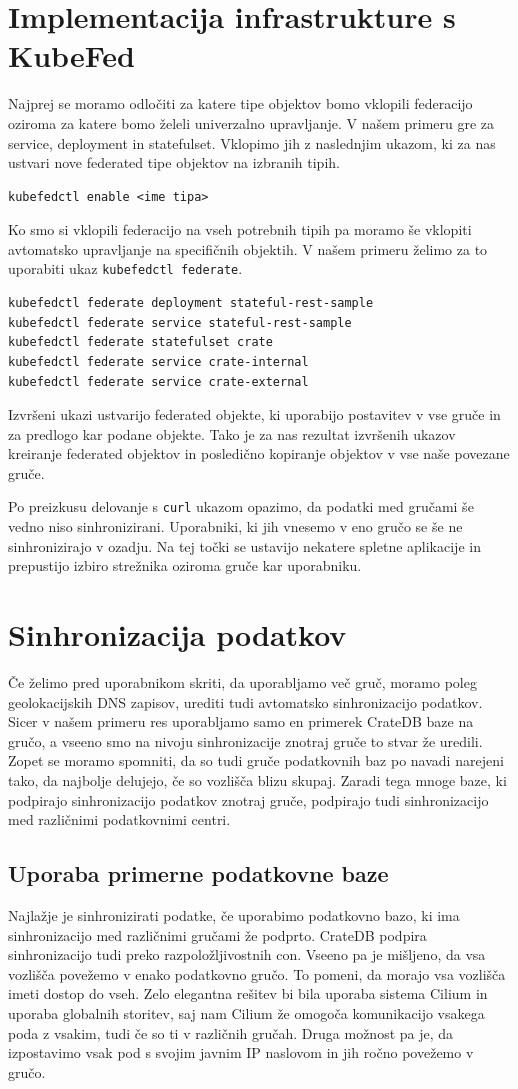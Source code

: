 \documentclass[a4paper, 12pt]{book}
\begin{document}
\section{Implementacija infrastrukture s KubeFed}
Najprej se moramo odločiti za katere tipe objektov bomo vklopili federacijo oziroma za katere bomo želeli univerzalno upravljanje.
V našem primeru gre za service, deployment in statefulset. Vklopimo jih z naslednjim ukazom, ki za nas ustvari nove federated tipe objektov na izbranih tipih.
\begin{verbatim}
kubefedctl enable <ime tipa>
\end{verbatim}
Ko smo si vklopili federacijo na vseh potrebnih tipih pa moramo še vklopiti avtomatsko upravljanje na specifičnih objektih.
V našem primeru želimo za to uporabiti ukaz \verb|kubefedctl federate|.
\begin{verbatim}
kubefedctl federate deployment stateful-rest-sample
kubefedctl federate service stateful-rest-sample
kubefedctl federate statefulset crate
kubefedctl federate service crate-internal
kubefedctl federate service crate-external
\end{verbatim}
Izvršeni ukazi ustvarijo federated objekte, ki uporabijo postavitev v vse gruče in za predlogo kar podane objekte.
Tako je za nas rezultat izvršenih ukazov kreiranje federated objektov in posledično kopiranje objektov v vse naše povezane gruče.

Po preizkusu delovanje s \verb|curl| ukazom opazimo, da podatki med gručami še vedno niso sinhronizirani.
Uporabniki, ki jih vnesemo v eno gručo se še ne sinhronizirajo v ozadju.
Na tej točki se ustavijo nekatere spletne aplikacije in prepustijo izbiro strežnika oziroma gruče kar uporabniku.
\section{Sinhronizacija podatkov}
Če želimo pred uporabnikom skriti, da uporabljamo več gruč, moramo poleg geolokacijskih DNS zapisov, urediti tudi avtomatsko sinhronizacijo podatkov.
Sicer v našem primeru res uporabljamo samo en primerek CrateDB baze na gručo, a vseeno smo na nivoju sinhronizacije znotraj gruče to stvar že uredili. 
Zopet se moramo spomniti, da so tudi gruče podatkovnih baz po navadi narejeni tako, da najbolje delujejo, če so vozlišča blizu skupaj.
Zaradi tega mnoge baze, ki podpirajo sinhronizacijo podatkov znotraj gruče, podpirajo tudi sinhronizacijo med različnimi podatkovnimi centri.
\subsection{Uporaba primerne podatkovne baze}
Najlažje je sinhronizirati podatke, če uporabimo podatkovno bazo, ki ima sinhronizacijo med različnimi gručami že podprto.
CrateDB podpira sinhronizacijo tudi preko razpoložljivostnih con.
Vseeno pa je mišljeno, da vsa vozlišča povežemo v enako podatkovno gručo.
To pomeni, da morajo vsa vozlišča imeti dostop do vseh.
Zelo elegantna rešitev bi bila uporaba sistema Cilium in uporaba globalnih storitev, saj nam Cilium že omogoča komunikacijo vsakega poda z vsakim, tudi če so ti v različnih gručah.
Druga možnost pa je, da izpostavimo vsak pod s svojim javnim IP naslovom in jih ročno povežemo v gručo.
\end{document}
